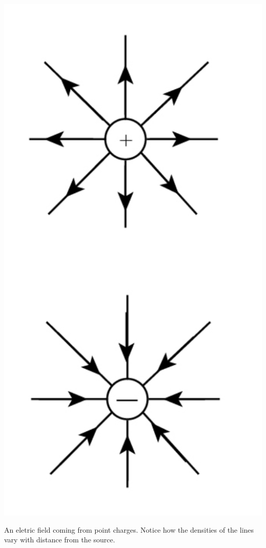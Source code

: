\documentclass[nobib]{tufte-handout}
\begin{document}
\begin{marginfigure}
    \includegraphics{eletricfieldlines.png}
    \caption{An eletric field coming from point charges. 
    Notice how the densities of the lines vary with distance from the source.}
    \label{fig:electric-field-lines-point-charge}
\end{marginfigure}

\marginnote{}
\end{document}
